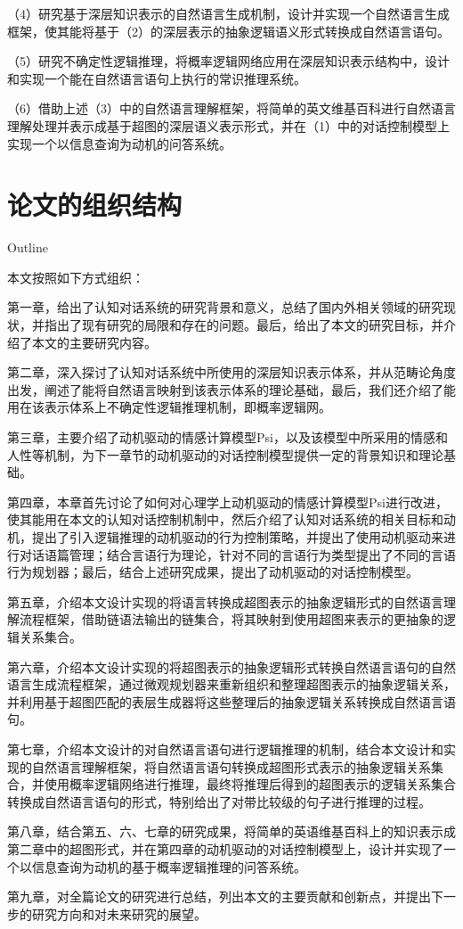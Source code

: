 （4）研究基于深层知识表示的自然语言生成机制，设计并实现一个自然语言生成框架，使其能将基于（2）的深层表示的抽象逻辑语义形式转换成自然语言语句。

（5）研究不确定性逻辑推理，将概率逻辑网络应用在深层知识表示结构中，设计和实现一个能在自然语言语句上执行的常识推理系统。

（6）借助上述（3）中的自然语言理解框架，将简单的英文维基百科进行自然语言理解处理并表示成基于超图的深层语义表示形式，并在（1）中的对话控制模型上实现一个以信息查询为动机的问答系统。

\section{论文的组织结构}{Outline}

本文按照如下方式组织：

第一章，给出了认知对话系统的研究背景和意义，总结了国内外相关领域的研究现状，并指出了现有研究的局限和存在的问题。最后，给出了本文的研究目标，并介绍了本文的主要研究内容。

第二章，深入探讨了认知对话系统中所使用的深层知识表示体系，并从范畴论角度出发，阐述了能将自然语言映射到该表示体系的理论基础，最后，我们还介绍了能用在该表示体系上不确定性逻辑推理机制，即概率逻辑网。

第三章，主要介绍了动机驱动的情感计算模型Psi，以及该模型中所采用的情感和人性等机制，为下一章节的动机驱动的对话控制模型提供一定的背景知识和理论基础。

第四章，本章首先讨论了如何对心理学上动机驱动的情感计算模型Psi进行改进，使其能用在本文的认知对话控制机制中，然后介绍了认知对话系统的相关目标和动机，提出了引入逻辑推理的动机驱动的行为控制策略，并提出了使用动机驱动来进行对话语篇管理；结合言语行为理论，针对不同的言语行为类型提出了不同的言语行为规划器；最后，结合上述研究成果，提出了动机驱动的对话控制模型。

第五章，介绍本文设计实现的将语言转换成超图表示的抽象逻辑形式的自然语言理解流程框架，借助链语法输出的链集合，将其映射到使用超图来表示的更抽象的逻辑关系集合。

第六章，介绍本文设计实现的将超图表示的抽象逻辑形式转换自然语言语句的自然语言生成流程框架，通过微观规划器来重新组织和整理超图表示的抽象逻辑关系，并利用基于超图匹配的表层生成器将这些整理后的抽象逻辑关系转换成自然语言语句。

第七章，介绍本文设计的对自然语言语句进行逻辑推理的机制，结合本文设计和实现的自然语言理解框架，将自然语言语句转换成超图形式表示的抽象逻辑关系集合，并使用概率逻辑网络进行推理，最终将推理后得到的超图表示的逻辑关系集合转换成自然语言语句的形式，特别给出了对带比较级的句子进行推理的过程。

第八章，结合第五、六、七章的研究成果，将简单的英语维基百科上的知识表示成第二章中的超图形式，并在第四章的动机驱动的对话控制模型上，设计并实现了一个以信息查询为动机的基于概率逻辑推理的问答系统。

第九章，对全篇论文的研究进行总结，列出本文的主要贡献和创新点，并提出下一步的研究方向和对未来研究的展望。
